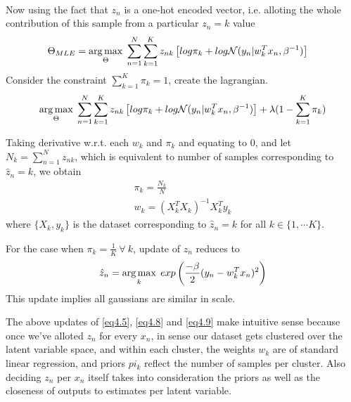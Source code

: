 \documentclass[a4paper,11pt]{article}
\begin{document}
\begin{mlsolution}
\begin{enumerate}
\begin{enumerate}
\begin{align*}
        \end{align*}
        Now using the fact that $z_n$ is a one-hot encoded vector, i.e. alloting the whole contribution of this sample from a particular $z_n = k$ value
        \begin{align}
            \Theta_{MLE} &= \mathop{\arg\max}_\Theta\; \sum_{n=1}^{N} \sum_{k=1}^{K} z_{nk}\left[log \pi_k + log \mathcal{N} (y_n \vert w_k^T x_n, \beta^{-1})\right]
        \end{align}
        Consider the constraint $\sum_{k=1}^{K} \pi_k = 1$, create the lagrangian.
        \begin{align}
            \mathop{\arg\max}_\Theta\; \sum_{n=1}^{N} \sum_{k=1}^{K} z_{nk}\left[log \pi_k + log \mathcal{N} (y_n \vert w_k^T x_n, \beta^{-1})\right] + \lambda (1 - \sum_{k=1}^{K} \pi_k)
        \end{align}
        
        Taking derivative w.r.t. each $w_k$ and $\pi_k$ and equating to 0, and let $N_k = \sum_{n=1}^{N} z_{nk}$, which is equivalent to number of samples corresponding to $\hat{z}_n = k$, we obtain
        \begin{align}
            \pi_k = \frac{N_k}{N} \label{eq4.8} \\
            w_k = (X_k^T X_k)^{-1} X_k^T y_k \label{eq4.9}
        \end{align}
        where $\{X_k, y_k\}$ is the dataset corresponding to $\hat{z}_n = k$ for all $k \in \{1, \cdots K\}$.

    \end{enumerate}
    For the case when $\pi_k = \frac{1}{K}\ \forall\ k$, update of $z_n$ reduces to
    \begin{align*}
        \hat{z}_n = \mathop{\arg\max}_k\; exp\left(\frac{-\beta}{2}(y_n - w^T_k x_n)^2\right)
    \end{align*}
    This update implies all gaussians are similar in scale.
\end{enumerate}
The above updates of \ref{eq4.5}, \ref{eq4.8} and \ref{eq4.9} make intuitive sense because once we've alloted $z_n$ for every $x_n$, in sense our dataset gets clustered over the latent variable space, and within each cluster, the weights $w_k$ are of standard linear regression, and priors $pi_k$ reflect the number of samples per cluster. Also deciding $z_n$ per $x_n$ itself takes into consideration the priors as well as the closeness of outputs to estimates per latent variable.

\end{mlsolution}
	
\end{document}
